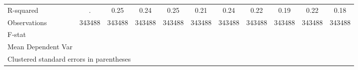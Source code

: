 {\begin{tabular}{l*{10}{c}}
\hline
R-squared           &           .         &        0.25         &        0.24         &        0.25         &        0.21         &        0.24         &        0.22         &        0.19         &        0.22         &        0.18         \\
Observations        &      343488         &      343488         &      343488         &      343488         &      343488         &      343488         &      343488         &      343488         &      343488         &      343488         \\
F-stat              &                     &                     &                     &                     &                     &                     &                     &                     &                     &                     \\
Mean Dependent Var  &                     &                     &                     &                     &                     &                     &                     &                     &                     &                     \\
\hline\hline
\multicolumn{11}{l}{\footnotesize Clustered standard errors in parentheses}\\
\end{tabular}
}
